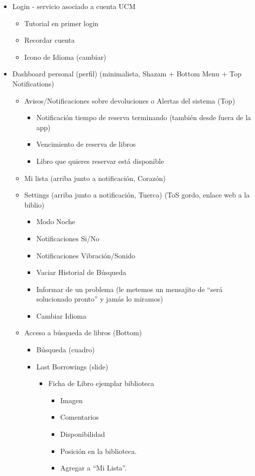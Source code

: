 \documentclass[12pt]{article}
\begin{document}
\begin{itemize}
\item Login - servicio asociado a cuenta UCM
\begin{itemize}
\item Tutorial en primer login
\item Recordar cuenta
\item Icono de Idioma (cambiar)
\end{itemize}
\item Dashboard personal (perfil) (minimalista, Shazam + Bottom Menu + Top Notifications)
\begin{itemize}
\item Avisos/Notificaciones sobre devoluciones o Alertas del sistema (Top)
\begin{itemize}
\item Notificación tiempo de reserva terminando (también desde fuera de la app)
\item Vencimiento de reserva de libros
\item Libro que quieres reservar está disponible

\end{itemize}

\item Mi lista (arriba junto a notificación, Corazón)

\item Settings (arriba junto a notificación, Tuerca) (ToS gordo, enlace web a la biblio)

\begin{itemize}
\item Modo Noche
\item Notificaciones Si/No
\item Notificaciones Vibración/Sonido
\item Vaciar Historial de Búsqueda
\item Informar de un problema (le metemos un mensajito de “será solucionado pronto” y jamás lo miramos)
\item Cambiar Idioma

\end{itemize}

\item Acceso a búsqueda de libros (Bottom)

\begin{itemize}
\item Búsqueda (cuadro)
\item Last Borrowings (slide)
\begin{itemize}
\item Ficha de Libro ejemplar biblioteca
\begin{itemize}
\item Imagen
\item Comentarios
\item Disponibilidad
\item Posición en la biblioteca.
\item Agregar a “Mi Lista”.


\end{itemize}
\end{itemize}
\end{itemize}
\end{itemize}
\end{itemize}
\end{document}
